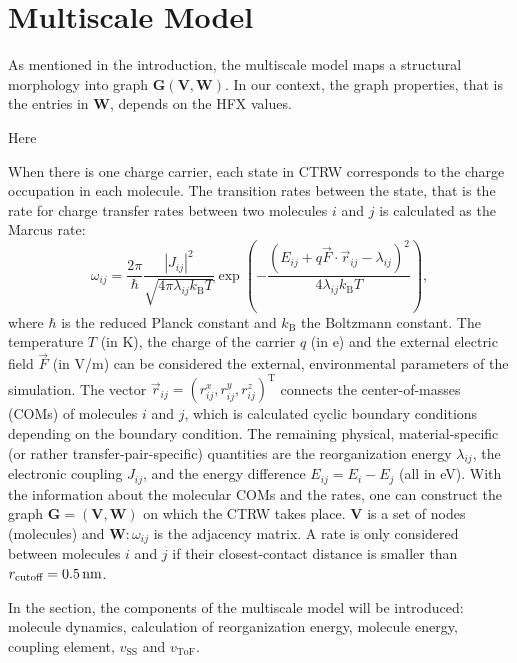 \documentclass[letterpaper,12pt]{article}
\begin{document}
\section{Multiscale Model}
As mentioned in the introduction, the multiscale model maps a structural morphology into graph $\mathbf{G}(\mathbf{V}, \mathbf{W})$. In our context, the graph properties, that is the entries in $\mathbf{W}$, depends on the HFX values. 

{\Huge Here}

When there is one charge carrier, each state in CTRW corresponds to the charge occupation in each molecule. The transition rates between the state, that is the rate for charge transfer rates between two molecules $i$ and $j$ is calculated as the Marcus rate:
%
\begin{equation}
    \omega_{ij} = \frac{2\pi}{\hbar} \frac{|J_{ij}|^2}{\sqrt{4\pi \lambda_{ij} k_\text{B}T}} \exp\left(-\frac{(E_{ij} + q \vec{F} \cdot \vec{r}_{ij} - \lambda_{ij})^2}{4\lambda_{ij} k_\text{B}T}\right) ,
    \label{equ:Marcus}
\end{equation}
%
where $\hbar$ is the reduced Planck constant and $k_\text{B}$ the Boltzmann constant. The temperature $T$ (in \unit[]{K}), the charge of the carrier $q$ (in \unit[]{e}) and the external electric field $\vec{F}$ (in V/m) can be considered the external, environmental parameters of the simulation. The vector $\vec{r}_{ij} = (r^x_{ij},r^y_{ij},r^z_{ij})^\text{T}$ connects the center-of-masses (COMs) of molecules $i$ and $j$, which is calculated cyclic boundary conditions depending on the boundary condition. The remaining physical, material-specific (or rather transfer-pair-specific) quantities are the reorganization energy $\lambda_{ij}$, the electronic coupling $J_{ij}$, and the energy difference $E_{ij} = E_i - E_j$ (all in \unit[]{eV}). With the information about the molecular COMs and the rates, one can construct the graph $\mathbf{G}=(\mathbf{V}, \mathbf{W})$ on which the CTRW takes place. $\mathbf{V}$ is a set of nodes (molecules) and $\mathbf{W}: \omega_{ij}$ is the adjacency matrix. A rate is only considered between molecules $i$ and $j$ if their closest-contact distance is smaller than $r_\text{cutoff}=\unit[0.5]{nm}$.

In the section, the components of the multiscale model will be introduced: molecule dynamics, calculation of reorganization energy, molecule energy, coupling element, $v_\text{SS}$ and $v_\text{ToF}$.

\end{document}
